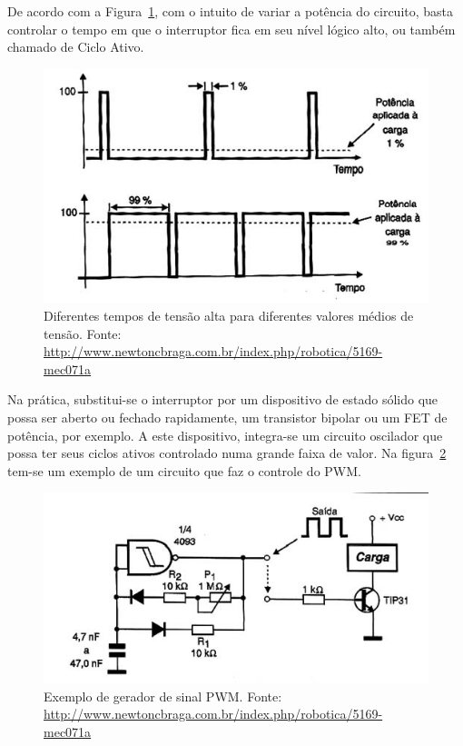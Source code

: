 De acordo com a Figura~\ref{fig:PWM3}, com o intuito de variar a potência do circuito, basta controlar o tempo em que o interruptor fica em seu nível lógico alto, ou também chamado de Ciclo Ativo.


\FloatBarrier
\begin{figure}[!htbp]
	\centering
	\includegraphics[scale=0.7]{imagens/PWM3}
	\caption{Diferentes tempos de tensão alta para diferentes valores médios de tensão. Fonte: \url{http://www.newtoncbraga.com.br/index.php/robotica/5169-mec071a}	 }%
	
	\label{fig:PWM3}
\end{figure}
\FloatBarrier


Na prática, substitui-se o interruptor por um dispositivo de estado sólido que possa ser aberto ou fechado rapidamente, um transistor bipolar ou um FET de potência, por exemplo. A este dispositivo, integra-se um circuito oscilador que possa ter seus ciclos ativos controlado numa grande faixa de valor.
Na figura~\ref{fig:PWM4} tem-se um exemplo de um circuito que faz o controle do PWM.

\FloatBarrier
\begin{figure}[!htbp]
	\centering
	\includegraphics[scale=0.7]{imagens/PWM4}
	\caption{Exemplo de gerador de sinal PWM. Fonte: \url{http://www.newtoncbraga.com.br/index.php/robotica/5169-mec071a} }%
	
	\label{fig:PWM4}
\end{figure}
\FloatBarrier

